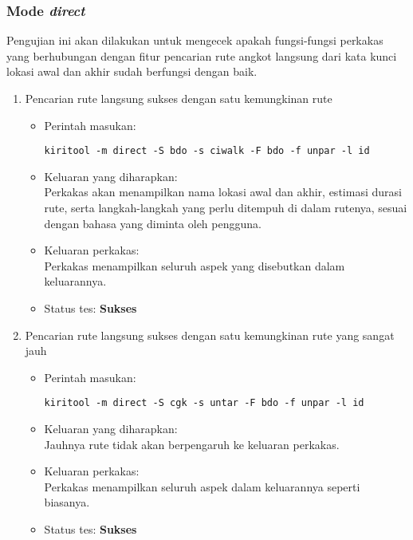 \begin{enumerate}
\end{enumerate}

\subsubsection{Mode \textit{direct}}
\label{sec:testing-experiments-testing-directroute}

Pengujian ini akan dilakukan untuk mengecek apakah fungsi-fungsi perkakas yang berhubungan dengan fitur pencarian rute angkot langsung dari kata kunci lokasi awal dan akhir sudah berfungsi dengan baik.

\begin{enumerate}
	\item Pencarian rute langsung sukses dengan satu kemungkinan rute
	\begin{itemize}
		\item Perintah masukan:
		\begin{verbatim}
kiritool -m direct -S bdo -s ciwalk -F bdo -f unpar -l id
		\end{verbatim}
		\item Keluaran yang diharapkan: \\
		Perkakas akan menampilkan nama lokasi awal dan akhir, estimasi durasi rute, serta langkah-langkah yang perlu ditempuh di dalam rutenya, sesuai dengan bahasa yang diminta oleh pengguna.
		\item Keluaran perkakas: \\
		Perkakas menampilkan seluruh aspek yang disebutkan dalam keluarannya.
		\item Status tes: \textbf{Sukses}
	\end{itemize}
	
	\item Pencarian rute langsung sukses dengan satu kemungkinan rute yang sangat jauh
	\begin{itemize}
		\item Perintah masukan:
		\begin{verbatim}
kiritool -m direct -S cgk -s untar -F bdo -f unpar -l id
		\end{verbatim}
		\item Keluaran yang diharapkan: \\
		Jauhnya rute tidak akan berpengaruh ke keluaran perkakas.
		\item Keluaran perkakas: \\
		Perkakas menampilkan seluruh aspek dalam keluarannya seperti biasanya.
		\item Status tes: \textbf{Sukses}
	\end{itemize}
	

\end{enumerate}
